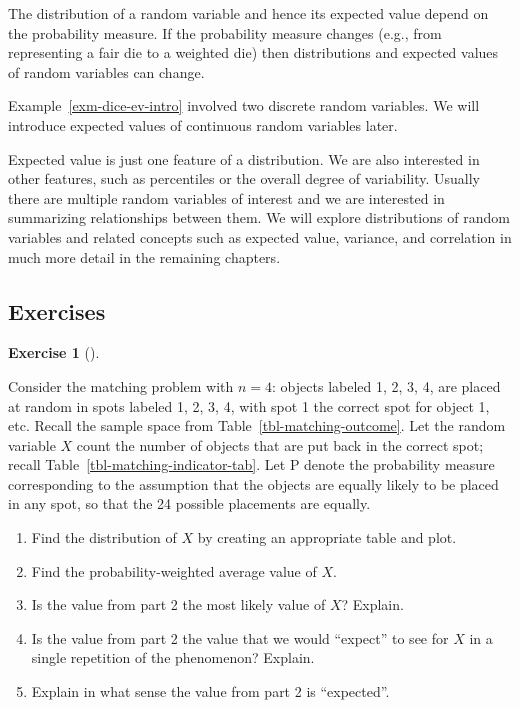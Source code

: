 \documentclass[
  letterpaper,
  DIV=11,
  numbers=noendperiod]{scrreprt}
\providecommand{\tightlist}{%
  \setlength{\itemsep}{0pt}\setlength{\parskip}{0pt}}
\theoremstyle{plain}
\theoremstyle{definition}
\theoremstyle{definition}
\newtheorem{exercise}{Exercise}[chapter]
\theoremstyle{definition}
\theoremstyle{remark}
\begin{document}
The distribution of a random variable and hence its expected value
depend on the probability measure. If the probability measure changes
(e.g., from representing a fair die to a weighted die) then
distributions and expected values of random variables can change.

Example~\ref{exm-dice-ev-intro} involved two discrete random variables.
We will introduce expected values of continuous random variables later.

Expected value is just one feature of a distribution. We are also
interested in other features, such as percentiles or the overall degree
of variability. Usually there are multiple random variables of interest
and we are interested in summarizing relationships between them. We will
explore distributions of random variables and related concepts such as
expected value, variance, and correlation in much more detail in the
remaining chapters.

\subsection{Exercises}\label{exercises-13}

\begin{exercise}[]\protect\hypertarget{exr-matching-rv-distribution}{}\label{exr-matching-rv-distribution}

Consider the matching problem with \(n=4\): objects labeled 1, 2, 3, 4,
are placed at random in spots labeled 1, 2, 3, 4, with spot 1 the
correct spot for object 1, etc. Recall the sample space from
Table~\ref{tbl-matching-outcome}. Let the random variable \(X\) count
the number of objects that are put back in the correct spot; recall
Table~\ref{tbl-matching-indicator-tab}. Let \(\textrm{P}\) denote the
probability measure corresponding to the assumption that the objects are
equally likely to be placed in any spot, so that the 24 possible
placements are equally.

\end{exercise}

\begin{enumerate}
\def\labelenumi{\arabic{enumi}.}
\tightlist
\item
  Find the distribution of \(X\) by creating an appropriate table and
  plot.
\item
  Find the probability-weighted average value of \(X\).
\item
  Is the value from part 2 the most likely value of \(X\)? Explain.
\item
  Is the value from part 2 the value that we would ``expect'' to see for
  \(X\) in a single repetition of the phenomenon? Explain.
\item
  Explain in what sense the value from part 2 is ``expected''.
\end{enumerate}
\end{document}
